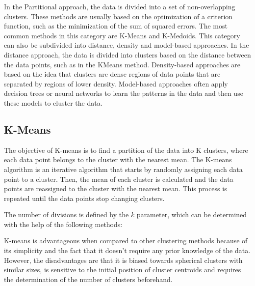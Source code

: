 In the Partitional approach, the data is divided into a set of non-overlapping clusters. These methods are usually based on the optimization of a criterion function, such as the minimization of the sum of squared errors. The most common methods in this category are K-Means and K-Medoids. This category can also be subdivided into distance, density and model-based approaches. In the distance approach, the data is divided into clusters based on the distance between the data points, such as in the KMeans method. Density-based approaches are based on the idea that clusters are dense regions of data points that are separated by regions of lower density. Model-based approaches often apply decision trees or neural networks to learn the patterns in the data and then use these models to cluster the data. \cite{Saxena.Prasad.ea_reviewclusteringtechniques_2017}


\subsection{K-Means}\label{sec:kmeans} 
The objective of K-means is to find a partition of the data into K clusters, where each data point belongs to the cluster with the nearest mean. The K-means algorithm is an iterative algorithm that starts by randomly assigning each data point to a cluster. Then, the mean of each cluster is calculated and the data points are reassigned to the cluster with the nearest mean. This process is repeated until the data points stop changing clusters. 

The number of divisions is defined by the $k$ parameter, which can be determined with the help of the following methods:




K-means is advantageous when compared to other clustering methods because of its simplicity and the fact that it doesn't require any prior knowledge of the data. However, the disadvantages are that it is biased towards spherical clusters with similar sizes, is sensitive to the initial position of cluster centroids and requires the determination of the number of clusters beforehand.

